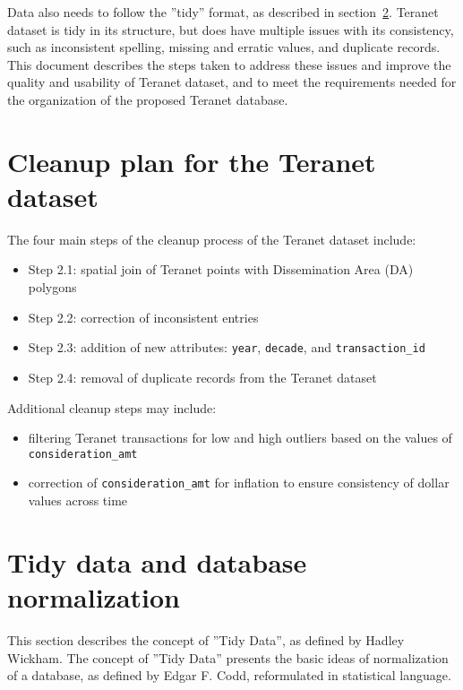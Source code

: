 \documentclass[11pt]{article}
\begin{document}
    Data also needs to follow the ''tidy'' format, as described in section~\ref{sec:db_norm_tidy_data}.
    Teranet dataset is tidy in its structure, but does have multiple issues with its consistency, such as inconsistent spelling, missing and erratic values, and duplicate records.
    This document describes the steps taken to address these issues and improve the quality and usability of Teranet dataset, and to meet the requirements needed for the organization of the proposed Teranet database.

    \section{Cleanup plan for the Teranet dataset} \label{sec:teranet_cleanup_plan}

    The four main steps of the cleanup process of the Teranet dataset include:
    \begin{itemize}
        \item Step 2.1: spatial join of Teranet points with Dissemination Area (DA) polygons
        \item Step 2.2: correction of inconsistent entries
        \item Step 2.3: addition of new attributes: \texttt{year}, \texttt{decade}, and \texttt{transaction\_id}
        \item Step 2.4: removal of duplicate records from the Teranet dataset
    \end{itemize}

    \vspace{5mm}

    Additional cleanup steps may include:
    \begin{itemize}
        \item filtering Teranet transactions for low and high outliers based on the values of \texttt{consideration\_amt}
        \item correction of \texttt{consideration\_amt} for inflation to ensure consistency of dollar values across time
    \end{itemize}

    \section{Tidy data and database normalization} \label{sec:db_norm_tidy_data}

    This section describes the concept of ''Tidy Data'', as defined by Hadley Wickham.
    The concept of ''Tidy Data'' presents the basic ideas of normalization of a database, as defined by Edgar F. Codd, reformulated in statistical language.
\end{document}
